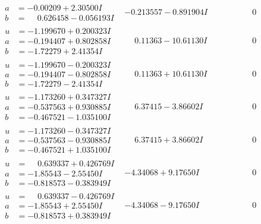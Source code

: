 \documentclass[1p]{elsarticle_modified}
\theoremstyle{definition}
\begin{document}
$$\begin{array}{c|c|c}
\begin{aligned}
a &= -0.00209 + 2.30500 I \\
b &= \phantom{-}0.626458 - 0.056193 I\end{aligned}
 & -0.213557 - 0.891904 I & \phantom{-0.000000 } 0 \\ \hline\begin{aligned}
u &= -1.199670 + 0.200323 I \\
a &= -0.194407 + 0.802858 I \\
b &= -1.72279 + 2.41354 I\end{aligned}
 & \phantom{-}0.11363 - 10.61130 I & \phantom{-0.000000 } 0 \\ \hline\begin{aligned}
u &= -1.199670 - 0.200323 I \\
a &= -0.194407 - 0.802858 I \\
b &= -1.72279 - 2.41354 I\end{aligned}
 & \phantom{-}0.11363 + 10.61130 I & \phantom{-0.000000 } 0 \\ \hline\begin{aligned}
u &= -1.173260 + 0.347327 I \\
a &= -0.537563 + 0.930885 I \\
b &= -0.467521 - 1.035100 I\end{aligned}
 & \phantom{-}6.37415 - 3.86602 I & \phantom{-0.000000 } 0 \\ \hline\begin{aligned}
u &= -1.173260 - 0.347327 I \\
a &= -0.537563 - 0.930885 I \\
b &= -0.467521 + 1.035100 I\end{aligned}
 & \phantom{-}6.37415 + 3.86602 I & \phantom{-0.000000 } 0 \\ \hline\begin{aligned}
u &= \phantom{-}0.639337 + 0.426769 I \\
a &= -1.85543 - 2.55450 I \\
b &= -0.818573 - 0.383949 I\end{aligned}
 & -4.34068 + 9.17650 I & \phantom{-0.000000 } 0 \\ \hline\begin{aligned}
u &= \phantom{-}0.639337 - 0.426769 I \\
a &= -1.85543 + 2.55450 I \\
b &= -0.818573 + 0.383949 I\end{aligned}
 & -4.34068 - 9.17650 I & \phantom{-0.000000 } 0 \\ \hline\begin{aligned}

\end{aligned}
\end{array}$$
\end{document}
